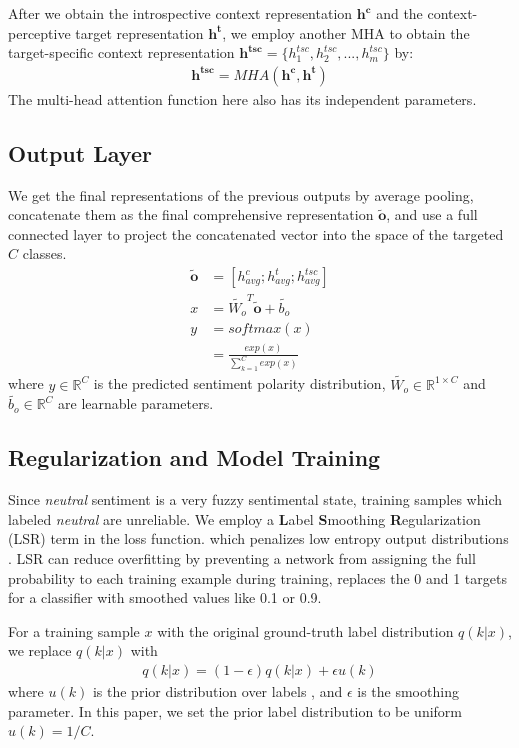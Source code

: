 \documentclass[11pt,a4paper]{article}
\begin{document}
After we obtain the introspective context representation $\mathbf{h^c}$ and
the context-perceptive target representation $\mathbf{h^t}$,
we employ another MHA to obtain the target-specific context representation $\mathbf{h^{tsc}}=\{h_1^{tsc}, h_2^{tsc}, ..., h_m^{tsc}\}$ by:
\begin{align}
\mathbf{h^{tsc}} = MHA(\mathbf{h^c}, \mathbf{h^t})
\end{align}
The multi-head attention function here also has its independent parameters.

\subsection{Output Layer}

We get the final representations of the previous outputs by average pooling,
concatenate them as the final comprehensive representation $\mathbf{\tilde{o}}$,
and use a full connected layer to project the concatenated vector into the space of the targeted $C$ classes.
\begin{align}
\mathbf{\tilde{o}} &= [h_{avg}^c; h_{avg}^t; h_{avg}^{tsc}] \\
x &= \tilde{W_o}^T{{\mathbf{\tilde{o}}}}+\tilde{b_o} \\
y &= softmax(x) \\
    &= \frac{exp(x)}{\sum_{k=1}^{C} exp(x)}
\end{align}
where $y \in \mathbb{R}^{C}$ is the predicted sentiment polarity distribution,
$\tilde{W_o} \in \mathbb{R}^{1 \times C}$ and $\tilde{b_o} \in \mathbb{R}^{C}$ are learnable parameters.

\subsection{Regularization and Model Training} \label{sec:LSR}

Since \textit{neutral} sentiment is a very fuzzy sentimental state, training samples which labeled \textit{neutral} are unreliable.
We employ a \textbf{L}abel \textbf{S}moothing \textbf{R}egularization (LSR) term in the loss function.
which penalizes low entropy output distributions \cite{szegedy2016rethinking}.
LSR can reduce overfitting by preventing a network from assigning the full probability to each training example during training, replaces the 0 and 1 targets for a classifier with smoothed values like 0.1 or 0.9.

For a training sample $x$ with the original ground-truth label distribution $q(k|x)$,
we replace $q(k|x)$ with
\begin{align}
q(k|x) = (1-\epsilon) q(k|x) + \epsilon u(k)
\end{align}
where $u(k)$ is the prior distribution over labels ,
and $\epsilon$ is the smoothing parameter.
In this paper, we set the prior label distribution to be uniform $u(k) = 1/C$.
\end{document}
